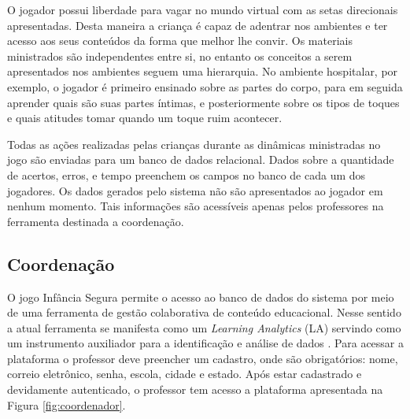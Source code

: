 \documentclass[12pt]{article}
\begin{document}
O jogador possui liberdade para vagar no mundo virtual com as setas direcionais apresentadas. Desta maneira a criança é capaz de adentrar nos ambientes e ter acesso aos seus conteúdos da forma que melhor lhe convir. Os materiais ministrados são independentes entre si, no entanto os conceitos a serem apresentados nos ambientes seguem uma hierarquia. No ambiente hospitalar, por exemplo, o jogador é primeiro ensinado sobre as partes do corpo, para em seguida aprender quais são suas partes íntimas, e posteriormente sobre os tipos de toques e quais atitudes tomar quando um toque ruim acontecer. 

Todas as ações realizadas pelas crianças durante as dinâmicas ministradas no jogo são enviadas para um banco de dados relacional. Dados sobre a quantidade de acertos, erros, e tempo preenchem os campos no banco de cada um dos jogadores. Os dados gerados pelo sistema não são apresentados ao jogador em nenhum momento. Tais informações são acessíveis apenas pelos professores na ferramenta destinada a coordenação.


\subsection{Coordenação}\label{secao:coordenacao}

O jogo Infância Segura permite o acesso ao banco de dados do sistema por meio de uma ferramenta de gestão colaborativa de conteúdo educacional. Nesse sentido a atual ferramenta se manifesta como um \textit{Learning Analytics} (LA) servindo como um instrumento auxiliador para a identificação e análise de dados \cite{prante2018professor}. Para acessar a plataforma o professor deve preencher um cadastro, onde são obrigatórios: nome, correio eletrônico, senha, escola, cidade e estado. Após estar cadastrado e devidamente autenticado, o professor tem acesso a plataforma apresentada na Figura \ref{fig:coordenador}.
\end{document}
